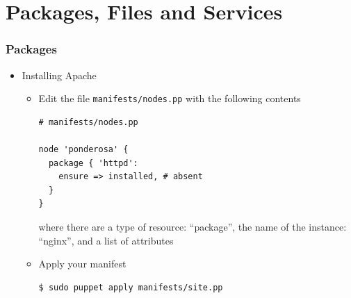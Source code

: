\documentclass{beamer}
\begin{document}
\section{Packages, Files and Services}

\begin{frame}[fragile]
\frametitle{Packages}
\begin{itemize}
 \item Installing Apache
\begin{itemize}
\item Edit the file \texttt{manifests/nodes.pp} with the following contents
\lstset{language=shell}
\begin{lstlisting}[escapechar=&]
# manifests/nodes.pp

node 'ponderosa' {
  package { 'httpd':
    ensure => installed, # absent
  }
}
\end{lstlisting}
where there are a type of resource: ``package'', the name of the instance: ``nginx'', and a list of attributes
\item Apply your manifest
\lstset{language=shell}
\begin{lstlisting}[escapechar=&]
$ sudo puppet apply manifests/site.pp 
\end{lstlisting}
\end{itemize}
\end{itemize}
\end{frame}
\end{document}
